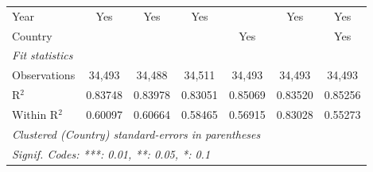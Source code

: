 \begin{tabular}{lcccccc}
   Year                                        & Yes            & Yes            & Yes            &                & Yes            & Yes\\  
   Country                                     &                &                &                & Yes            &                & Yes\\  
   \midrule
   \emph{Fit statistics}\\
   Observations                                & 34,493         & 34,488         & 34,511         & 34,493         & 34,493         & 34,493\\  
   R$^2$                                       & 0.83748        & 0.83978        & 0.83051        & 0.85069        & 0.83520        & 0.85256\\  
   Within R$^2$                                & 0.60097        & 0.60664        & 0.58465        & 0.56915        & 0.83028        & 0.55273\\  
   \midrule \midrule
   \multicolumn{7}{l}{\emph{Clustered (Country) standard-errors in parentheses}}\\
   \multicolumn{7}{l}{\emph{Signif. Codes: ***: 0.01, **: 0.05, *: 0.1}}\\
\end{tabular}
\par\endgroup


